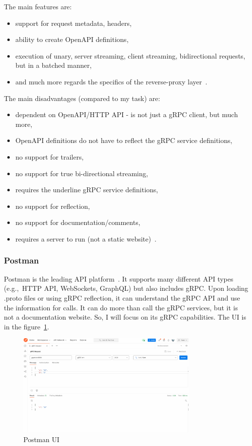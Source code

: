 The main features are:
\begin{itemize}
    \item support for request metadata, headers,
    \item ability to create OpenAPI definitions,
    \item execution of unary, server streaming, client streaming, bidirectional requests, but in a batched manner,
    \item and much more regards the specifics of the reverse-proxy layer~\cite{grpc-gateway}.
\end{itemize}

The main disadvantages (compared to my task) are:
\begin{itemize}
    \item dependent on OpenAPI/HTTP API - is not just a gRPC client, but much more,
    \item OpenAPI definitions do not have to reflect the gRPC service definitions,
    \item no support for trailers,
    \item no support for true bi-directional streaming,
    \item requires the underline gRPC service definitions,
    \item no support for reflection,
    \item no support for documentation/comments,
    \item requires a server to run (not a static website)~\cite{grpc-gateway}.
\end{itemize}

\subsubsection{Postman}
Postman is the leading API platform~\cite{postman-popularity}.
It supports many different API types (e.g.,\ HTTP API, WebSockets, GraphQL) but also includes gRPC\@.
Upon loading .proto files or using gRPC reflection, it can understand the gRPC API and use the information for calls.
It can do more than call the gRPC services, but it is not a documentation website.
So, I will focus on its gRPC capabilities.
The UI is in the figure~\ref{fig:postman}.
\cite{postman}

\begin{figure}[hbt!]
    \centering
    \captionsetup{justification=centering}
    \includegraphics[width=0.8\textwidth]{images/postman}
    \caption{Postman UI~\cite{postman}}
    \label{fig:postman}
\end{figure}

